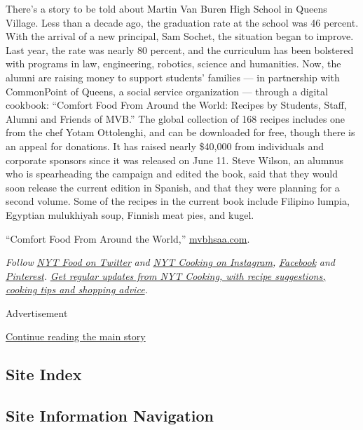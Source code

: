 There's a story to be told about Martin Van Buren High School in Queens
Village. Less than a decade ago, the graduation rate at the school was
46 percent. With the arrival of a new principal, Sam Sochet, the
situation began to improve. Last year, the rate was nearly 80 percent,
and the curriculum has been bolstered with programs in law, engineering,
robotics, science and humanities. Now, the alumni are raising money to
support students' families --- in partnership with CommonPoint of
Queens, a social service organization --- through a digital cookbook:
``Comfort Food From Around the World: Recipes by Students, Staff, Alumni
and Friends of MVB.'' The global collection of 168 recipes includes one
from the chef Yotam Ottolenghi, and can be downloaded for free, though
there is an appeal for donations. It has raised nearly \$40,000 from
individuals and corporate sponsors since it was released on June 11.
Steve Wilson, an alumnus who is spearheading the campaign and edited the
book, said that they would soon release the current edition in Spanish,
and that they were planning for a second volume. Some of the recipes in
the current book include Filipino lumpia, Egyptian mulukhiyah soup,
Finnish meat pies, and kugel.

``Comfort Food From Around the World,''
\href{https://www.mvbhsaa.com/}{mvbhsaa.com}.

\emph{Follow} \href{https://twitter.com/nytfood}{\emph{NYT Food on
Twitter}} \emph{and}
\href{https://www.instagram.com/nytcooking/}{\emph{NYT Cooking on
Instagram}}\emph{,}
\href{https://www.facebook.com/nytcooking/}{\emph{Facebook}} \emph{and}
\href{https://www.pinterest.com/nytcooking/}{\emph{Pinterest}}\emph{.}
\href{https://www.nytimes.com/newsletters/cooking}{\emph{Get regular
updates from NYT Cooking, with recipe suggestions, cooking tips and
shopping advice}}\emph{.}

Advertisement

\protect\hyperlink{after-bottom}{Continue reading the main story}

\hypertarget{site-index}{%
\subsection{Site Index}\label{site-index}}

\hypertarget{site-information-navigation}{%
\subsection{Site Information
Navigation}\label{site-information-navigation}}


